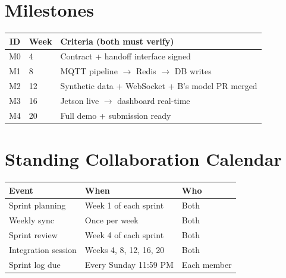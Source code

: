 \documentclass[12pt,a4paper]{article}
\begin{document}
\section{Milestones}

\begin{center}
\begin{tabularx}{\textwidth}{clX}
\toprule
\rowcolor{primary!20}
\textbf{ID} & \textbf{Week} & \textbf{Criteria (both must verify)} \\
\midrule
M0 & 4 & Contract + handoff interface signed \\
M1 & 8 & MQTT pipeline $\rightarrow$ Redis $\rightarrow$ DB writes \\
M2 & 12 & Synthetic data + WebSocket + B's model PR merged \\
M3 & 16 & Jetson live $\rightarrow$ dashboard real-time \\
M4 & 20 & Full demo + submission ready \\
\bottomrule
\end{tabularx}
\end{center}

\section{Standing Collaboration Calendar}

\begin{center}
\begin{tabular}{lll}
\toprule
\rowcolor{primary!20}
\textbf{Event} & \textbf{When} & \textbf{Who} \\
\midrule
Sprint planning & Week 1 of each sprint & Both \\
Weekly sync & Once per week & Both \\
Sprint review & Week 4 of each sprint & Both \\
Integration session & Weeks 4, 8, 12, 16, 20 & Both \\
Sprint log due & Every Sunday 11:59 PM & Each member \\
\bottomrule
\end{tabular}
\end{center}

\end{document}
